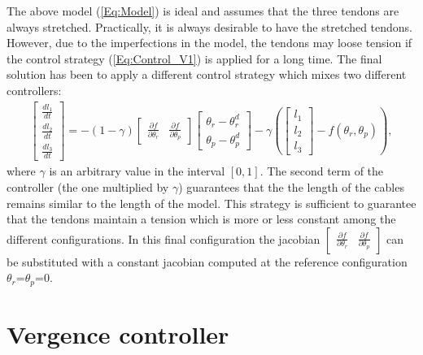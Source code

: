 The above model (\ref{Eq:Model}) is ideal and assumes that the three tendons are always stretched. Practically, it is always desirable to have the stretched tendons. However, due to the imperfections in the model, the tendons may loose tension if the control strategy (\ref{Eq:Control_V1}) is applied for a long time. The final solution has been to apply a different control strategy which mixes two different controllers:
\begin{eqnarray} \label{Eq:Control_V2}
\begin{bmatrix}
\frac{d l_1}{dt}\\
\frac{d l_2}{dt}\\
\frac{d l_3}{dt}
\end{bmatrix} = -(1-\gamma)\begin{bmatrix} \frac{\partial f} {\partial \theta_r} &  \frac{\partial f} {\partial \theta_p} \end{bmatrix}
 \begin{bmatrix}
\theta_r - \theta_r^d\\
\theta_p - \theta_p^d
\end{bmatrix} - \gamma \left( \begin{bmatrix} l_1\\
l_2\\
l_3
\end{bmatrix} - f(\theta_r, \theta_p) \right),
\end{eqnarray}
where $\gamma$ is an arbitrary value in the interval $[0, 1]$. The second term of the controller (the one multiplied by $\gamma$) guarantees that the the length of the cables remains similar to the length of the model. This strategy is sufficient to guarantee that the tendons maintain a tension which is more or less constant among the different configurations. In this final configuration the jacobian $\begin{bmatrix} \frac{\partial f} {\partial \theta_r} &  \frac{\partial f} {\partial \theta_p} \end{bmatrix}$ can be substituted with a constant jacobian computed at the reference configuration $\theta_r$=$\theta_p$=0.

\section{Vergence controller}

